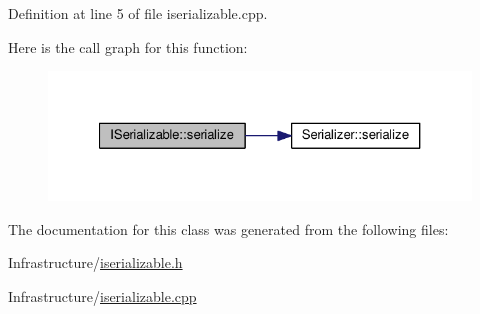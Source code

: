 Definition at line 5 of file iserializable.\+cpp.



Here is the call graph for this function\+:
\nopagebreak
\begin{figure}[H]
\begin{center}
\leavevmode
\includegraphics[width=327pt]{class_i_serializable_afad8ad3e1cd1ecaa583cf92a19aa0ef0_cgraph}
\end{center}
\end{figure}




The documentation for this class was generated from the following files\+:\begin{DoxyCompactItemize}
\item 
Infrastructure/\hyperlink{iserializable_8h}{iserializable.\+h}\item 
Infrastructure/\hyperlink{iserializable_8cpp}{iserializable.\+cpp}\end{DoxyCompactItemize}
